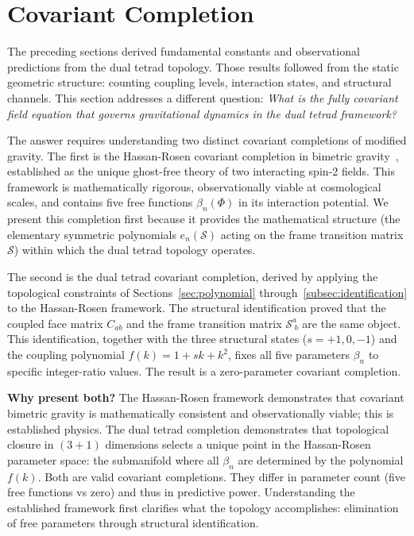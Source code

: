 \documentclass[aps,prd,preprint,superscriptaddress,showpacs,preprintnumbers,amsmath,amssymb,nofootinbib]{revtex4-2}
\begin{document}
\section{Covariant Completion}
\label{sec:covariant}

The preceding sections derived fundamental constants and observational predictions from the dual tetrad topology. Those results followed from the static geometric structure: counting coupling levels, interaction states, and structural channels. This section addresses a different question: \emph{What is the fully covariant field equation that governs gravitational dynamics in the dual tetrad framework?}

The answer requires understanding two distinct covariant completions of modified gravity. The first is the Hassan-Rosen covariant completion in bimetric gravity~\cite{hassan2012}, established as the unique ghost-free theory of two interacting spin-2 fields. This framework is mathematically rigorous, observationally viable at cosmological scales, and contains five free functions $\beta_n(\Phi)$ in its interaction potential. We present this completion first because it provides the mathematical structure (the elementary symmetric polynomials $e_n(\mathcal{S})$ acting on the frame transition matrix $\mathcal{S}$) within which the dual tetrad topology operates.

The second is the dual tetrad covariant completion, derived by applying the topological constraints of Sections~\ref{sec:polynomial} through~\ref{subsec:identification} to the Hassan-Rosen framework. The structural identification proved that the coupled face matrix $C_{ab}$ and the frame transition matrix $\mathcal{S}^a_{\;b}$ are the same object. This identification, together with the three structural states ($s = +1, 0, -1$) and the coupling polynomial $f(k) = 1 + sk + k^2$, fixes all five parameters $\beta_n$ to specific integer-ratio values. The result is a zero-parameter covariant completion.

\textbf{Why present both?} The Hassan-Rosen framework demonstrates that covariant bimetric gravity is mathematically consistent and observationally viable; this is established physics. The dual tetrad completion demonstrates that topological closure in $(3{+}1)$ dimensions selects a unique point in the Hassan-Rosen parameter space: the submanifold where all $\beta_n$ are determined by the polynomial $f(k)$. Both are valid covariant completions. They differ in parameter count (five free functions vs zero) and thus in predictive power. Understanding the established framework first clarifies what the topology accomplishes: elimination of free parameters through structural identification.
\end{document}
